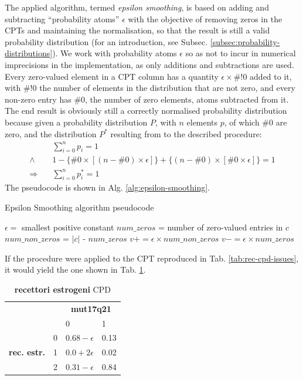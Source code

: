 The applied algorithm, termed \textit{epsilon smoothing}, is based on adding and subtracting \enquote{probability atoms} $\epsilon$ with the objective of removing zeros in the CPTs and maintaining the normalisation, so that the result is still a valid probability distribution (for an introduction, see Subsec. \ref{subsec:probability-distributions}).
We work with probability atoms $\epsilon$ so as not to incur in numerical imprecisions in the implementation, as only additions and subtractions are used.
Every zero-valued element in a CPT column has a quantity $\epsilon \times \#!0$ added to it, with $\#!0$ the number of elements in the distribution that are not zero, and every non-zero entry has $\#0$, the number of zero elements, atoms subtracted from it.
The end result is obviously still a correctly normalised probability distribution because given a probability distribution $P$, with $n$ elements $p$, of which $\#0$ are zero, and the  distribution $P^*$ resulting from to the described procedure:
\begin{align*}
	&\sum_{i=0}^{n} p_i = 1 \\
	\wedge  \quad &1 - \{ \#0 \times [(n - \#0) \times \epsilon] \} + \{ (n - \#0) \times [\#0 \times \epsilon] \}  = 1 \\
	\Rightarrow \quad  &\sum_{i=0}^{n} p^*_i = 1
\end{align*}
The pseudocode is shown in Alg. \ref{alg:epsilon-smoothing}.

\begin{algorithm}[htp!]
	\caption{Epsilon Smoothing algorithm pseudocode}
	\label{alg:epsilon-smoothing}
	\begin{algorithmic}[1]
		\State $\epsilon=$ smallest positive constant
			 
				\State $num\_zeros$ = number of zero-valued entries in $c$
				\State $num\_non\_zeros$ = $|c|$ - $num\_zeros$
						\State $v += \epsilon \times num\_non\_zeros$
					\Else
						\State $v -= \epsilon \times num\_zeros$
					\EndIf
				\EndFor
			\EndFor
		\EndFor
	\end{algorithmic}
\end{algorithm}

If the procedure were applied to the CPT reproduced in Tab. \ref{tab:rec-cpd-issues}, it would yield the one shown in Tab. \ref{tab:rec-cpd-epsilon}.

\begin{table}[htbp]
\centering
\caption{\textbf{recettori estrogeni} CPD}
\begin{tabularx}{\textwidth/2}{ccXX}
\toprule
      & &  \multicolumn{2}{c}{\textbf{mut17q21}} \\
\cmidrule(lr){3-4}
 & & 0 & 1    \\ 
 \multirow{3}{*}{\textbf{rec. estr.}}  & 0 & $0.68 - \epsilon$ & 0.13  \\
 & 1 & $0.0 + 2\epsilon$ & 0.02    \\
 & 2 & $0.31 - \epsilon$ & 0.84 \\
\bottomrule
\end{tabularx}
\label{tab:rec-cpd-epsilon}
\end{table}


